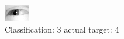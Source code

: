 \begin{figure}[h!]
\begin{center}
\includegraphics[width=0.60\columnwidth]{figures/ID2424_class_3_target_4.png}
\end{center}
\caption{ Classification: 3 actual target: 4}
\label{fig:ID2424_class_3_target_4}
\end{figure}
